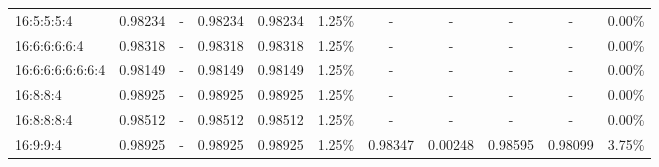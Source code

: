 \documentclass[spanish,a4paper,12pt,twoside]{report}
\begin{document}
\begin{landscape}
\begin{center}
\begin{tabular}{l c c c c r c c c c r}
        16:5:5:5:4 & 0.98234 & - & 0.98234 & 0.98234 & 1.25\% & - & - & - & - & 0.00\% \\
        16:6:6:6:6:4 & 0.98318 & -& 0.98318 & 0.98318 & 1.25\% & - & - & - & - & 0.00\% \\
        16:6:6:6:6:6:6:4 & 0.98149 &- & 0.98149 & 0.98149 & 1.25\% & - & - & - & - & 0.00\% \\
        16:8:8:4 & 0.98925 & - & 0.98925 & 0.98925 & 1.25\% & - & - & - & - & 0.00\% \\
        16:8:8:8:4 & 0.98512 & - & 0.98512 & 0.98512 & 1.25\% & - & - & - & - & 0.00\% \\
        16:9:9:4 & 0.98925 & - & 0.98925 & 0.98925 & 1.25\% & 0.98347 & 0.00248 & 0.98595 & 0.98099 & 3.75\% \\[1ex]
        \hline
      \end{tabular}
    \end{center}
  \end{landscape} \par
\end{document}

